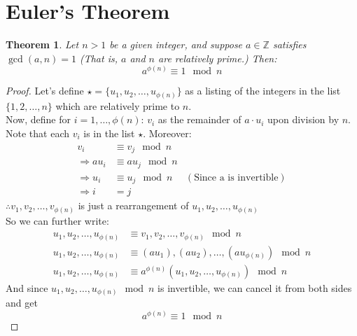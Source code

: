 \documentclass[10pt]{article}
\newcommand{\Z}{\mathbb{Z}}
\newtheorem{theorem}{Theorem}
\theoremstyle{definition}
\theoremstyle{remark}
\def\Z{\mathbb{ Z}}
\def\ra{\Rightarrow}
\begin{document}
\section{Euler’s Theorem}
\begin{theorem}
Let $n>1$ be a given integer, and suppose $a \in \Z$ satisfies $\gcd(a,n) = 1$ (That is, $a$ and $n$ are relatively prime.)  Then: $$a^{\phi(n)} \equiv 1 \mod n$$
\end{theorem}
\begin{proof}
Let's define $\star = \{u_1, u_2, \ldots, u_{\phi(n)}\}$ as a listing of the integers in the list $\{1,2,\ldots,n\}$ which are relatively prime to $n$.\\
Now, define for $i = 1,\ldots, \phi(n)$: $v_i$ as the remainder of $a \cdot u_i$ upon division by $n$.\\
Note that each $v_i$ is in the list $\star$.  Moreover:
\begin{align*}
v_i &\equiv v_j \mod n\\
\ra au_i &\equiv au_j \mod n\\
\ra u_i &\equiv u_j \mod n &(\text{Since a is invertible})\\
\ra i &= j
\end{align*}
$\therefore v_1, v_2, \ldots, v_{\phi(n)}$ is just a rearrangement of $u_1, u_2, \ldots, u_{\phi(n)}$\\
So we can further write:
\begin{align*}
u_1, u_2, \ldots, u_{\phi(n)} &\equiv v_1, v_2, \ldots, v_{\phi(n)} \mod n\\
u_1, u_2, \ldots, u_{\phi(n)} &\equiv (au_1), (au_2), \ldots, (au_{\phi(n)}) \mod n\\
u_1, u_2, \ldots, u_{\phi(n)} &\equiv a^{\phi(n)}(u_1, u_2, \ldots, u_{\phi(n)}) \mod n
\end{align*}
And since $u_1, u_2, \ldots, u_{\phi(n)} \mod n$ is invertible, we can cancel it from both sides and get
$$a^{\phi(n)} \equiv 1 \mod n$$
\end{proof}
\end{document}
